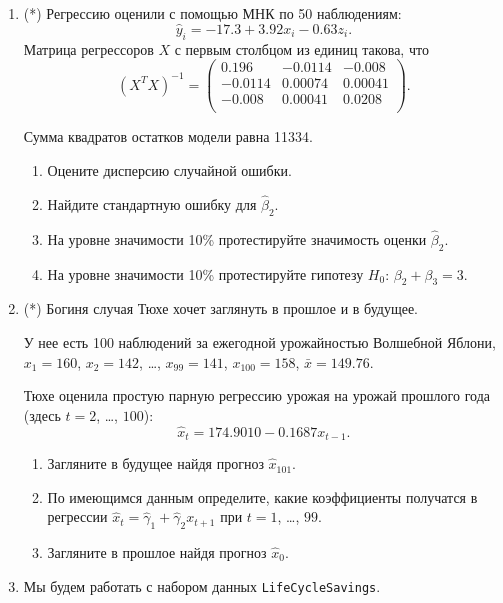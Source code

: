 \documentclass[12pt]{article}
\begin{document}
\begin{enumerate}
\newpage
    \item (*) Регрессию оценили с помощью МНК по 50 наблюдениям:
    \[
    \hat y_i = -17.3 + 3.92 x_i - 0.63 z_i.    
    \]
    Матрица регрессоров $X$ с первым столбцом из единиц такова, что 
    \[
    (X^TX)^{-1} = \begin{pmatrix}
        0.196 & -0.0114 & -0.008 \\
        -0.0114 &  0.00074 & 0.00041 \\
        -0.008 & 0.00041 & 0.0208 \\
    \end{pmatrix}.    
    \]

    Сумма квадратов остатков модели равна 11334.

\begin{enumerate}
    \item Оцените дисперсию случайной ошибки.
    \item Найдите стандартную ошибку для $\hat\beta_2$.
    \item На уровне значимости 10\% протестируйте значимость оценки $\hat\beta_2$.
    \item На уровне значимости 10\% протестируйте гипотезу $H_0$: $\beta_2 + \beta_3 = 3$.
\end{enumerate}


\item (*) Богиня случая Тюхе хочет заглянуть в прошлое и в будущее. 

У нее есть 100 наблюдений за ежегодной урожайностью Волшебной Яблони,
$x_1 = 160$, $x_2 = 142$, \ldots, $x_{99} = 141$, $x_{100} = 158$, 
$\bar x = 149.76$. 

Тюхе оценила простую парную регрессию урожая на урожай прошлого года (здесь $t=2$, \ldots, $100$):
\[
\hat x_t = 174.9010 - 0.1687 x_{t-1}.
\]

\begin{enumerate}
    \item Загляните в будущее найдя прогноз $\hat x_{101}$.
    \item По имеющимся данным определите, какие коэффициенты получатся 
    в регрессии $\hat x_t = \hat\gamma_1 +\hat\gamma_2 x_{t+1}$ при $t=1$, \ldots, $99$.
    \item Загляните в прошлое найдя прогноз $\hat x_{0}$.
\end{enumerate}


\newpage
    \item Мы будем работать с набором данных \verb|LifeCycleSavings|.


\end{enumerate}
\end{document}
